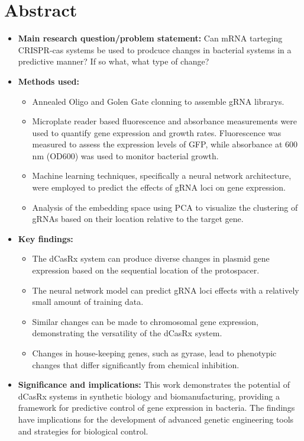 \documentclass[12pt]{article}
\begin{document}
\section*{Abstract}
\begin{itemize}
    \item \textbf{Main research question/problem statement:} Can mRNA tarteging CRISPR-cas systems be used to prodcuce changes in bacterial systems in a predictive manner? If so what, what type of change?
    \item \textbf{Methods used:}
    \begin{itemize}
        \item Annealed Oligo and Golen Gate clonning to assemble gRNA librarys.
        \item Microplate reader based fluorescence and absorbance measurements were used to quantify gene expression and growth rates. Fluorescence was measured to assess the expression levels of GFP, while absorbance at 600 nm (OD600) was used to monitor bacterial growth.
        \item Machine learning techniques, specifically a neural network architecture, were employed to predict the effects of gRNA loci on gene expression.
        \item Analysis of the embedding space using PCA to visualize the clustering of gRNAs based on their location relative to the target gene.
    \end{itemize}
    \item \textbf{Key findings:}
        \begin{itemize}
            \item The dCasRx system can produce diverse changes in plasmid gene expression based on the sequential location of the protospacer.
            \item The neural network model can predict gRNA loci effects with a relatively small amount of training data.
            \item Similar changes can be made to chromosomal gene expression, demonstrating the versatility of the dCasRx system.
            \item Changes in house-keeping genes, such as gyrase, lead to phenotypic changes that differ significantly from chemical inhibition.
        \end{itemize}
    \item \textbf{Significance and implications:} This work demonstrates the potential of dCasRx systems in synthetic biology and biomanufacturing, providing a framework for predictive control of gene expression in bacteria. The findings have implications for the development of advanced genetic engineering tools and strategies for biological control.
\end{itemize}
\end{document}
